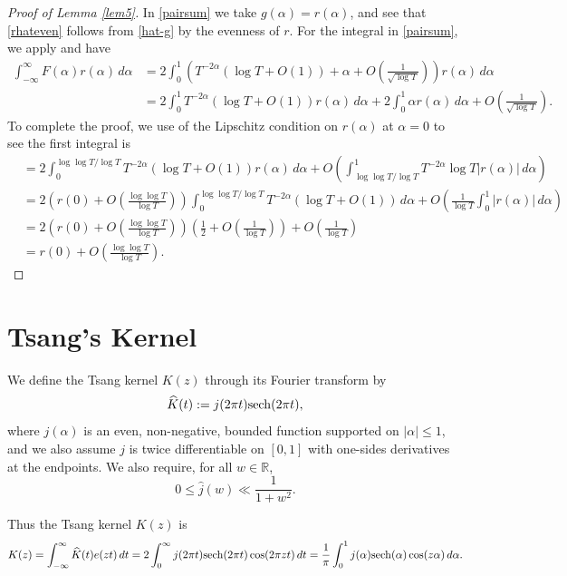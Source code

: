 \documentclass{amsart}
\newcommand{\1}{\mathbbm{1}}
\theoremstyle{remark}
\numberwithin{equation}{section}
\begin{document}
\begin{proof}[Proof of Lemma \ref{lem5}] In \eqref{pairsum} we take $g(\alpha)= r(\alpha)$, and see that \eqref{rhateven}
follows from \eqref{hat-g} by the evenness of $r$. For the integral in \eqref{pairsum}, we apply  and have
\[ \begin{split} \int_{-\infty}^\infty F(\alpha)r(\alpha)\,d\alpha &= 2\int_0^1 \left(T^{-2\alpha}(\log T +O(1))+ \alpha +O\left(\frac1{\sqrt{\log T}}\right)\right)r(\alpha) \, d\alpha\\&
=2\int_0^1 T^{-2\alpha}(\log T +O(1)) r(\alpha)\, d\alpha + 2\int_0^1\alpha r(\alpha)\, d\alpha +O\left(\frac1{\sqrt{\log T}}\right). \end{split}\]
To complete the proof, we use of the Lipschitz condition on $r(\alpha)$ at $\alpha=0$ to see the first integral is
\[ \begin{split} &= 2\int_0^{\log\log T/\log T} T^{-2\alpha}(\log T +O(1))r(\alpha) \, d\alpha+O\left( \int_{\log\log T/\log T}^1 T^{-2\alpha}\log T |r(\alpha)|\, d\alpha \right) \\&
= 2\left( r(0)+ O\left(\frac{\log\log T}{\log T}\right)\right) \int_0^{\log\log T/\log T}T^{-2\alpha}(\log T +O(1))\, d\alpha + O\left(\frac1{\log T}\int_0^1|r(\alpha )|\, d\alpha\right)\\&
= 2\left( r(0)+ O\left(\frac{\log\log T}{\log T}\right)\right)\left(\frac12 +O\left(\frac1{\log T}\right)\right) + O\left(\frac1{\log T}\right) \\&
= r(0) + O\left(\frac{\log\log T}{\log T}\right).
\end{split}\]
\end{proof}


\section{Tsang's Kernel}
We define the Tsang kernel $K(z)$ through its Fourier transform by
\begin{equation}\label{TsangFT} \widehat{K}(t) := j(2\pi t){\rm sech}(2 \pi t) ,\end{equation}
where $j(\alpha)$ is an even, non-negative, bounded function supported on $|\alpha|\le 1$, and we also assume $j$ is twice differentiable on $[0,1]$ with one-sides derivatives at the endpoints. We also require, for all $w \in \mathbb{R}$,
\[ 0\le \widehat{j}(w) \ll \frac1{1+w^2}. \]

Thus the Tsang kernel $K(z)$ is
\begin{equation}\label{K(z)} K(z)= \int_{-\infty}^\infty \widehat{K}(t) e(zt)\, dt = 2\int_0^\infty j(2\pi t){\rm sech}(2\pi t)\cos(2\pi z t) \, dt 
=\frac1{\pi}\int_0^1 j(\alpha){\rm sech}( \alpha)\cos( z \alpha) \, d\alpha.\end{equation}
\end{document}
